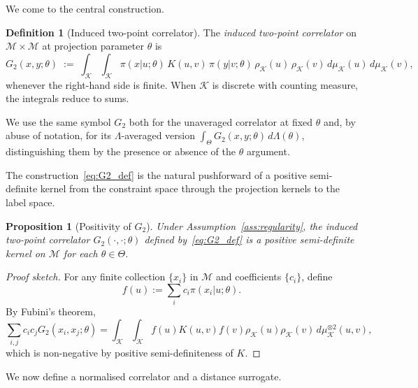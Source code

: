 ﻿\documentclass[12pt,a4paper]{article}
\newtheorem{proposition}[theorem]{Proposition}
\theoremstyle{definition}
\newtheorem{definition}[theorem]{Definition}
\begin{document}
We come to the central construction.

\begin{definition}[Induced two-point correlator]
The \emph{induced two-point correlator} on $\mathcal{M} \times \mathcal{M}$ at projection parameter $\theta$ is
\begin{equation}
\label{eq:G2_def}
G_2(x,y;\theta) \;:=\; \int_{\mathcal{K}} \int_{\mathcal{K}} \pi(x|u;\theta)\, K(u,v)\, \pi(y|v;\theta)\, \rho_{\mathcal{K}}(u)\,\rho_{\mathcal{K}}(v)\, d\mu_{\mathcal{K}}(u)\, d\mu_{\mathcal{K}}(v),
\end{equation}
whenever the right-hand side is finite. When $\mathcal{K}$ is discrete with counting measure, the integrals reduce to sums.
\end{definition}

We use the same symbol $G_2$ both for the unaveraged correlator at fixed $\theta$ and, by abuse of notation, for its $\Lambda$-averaged version $\int_\Theta G_2(x,y;\theta) \, d\Lambda(\theta)$, distinguishing them by the presence or absence of the $\theta$ argument.

The construction~\eqref{eq:G2_def} is the natural pushforward of a positive semi-definite kernel from the constraint space through the projection kernels to the label space.

\begin{proposition}[Positivity of $G_2$]
\label{prop:G2_psd}
Under Assumption~\ref{ass:regularity}, the induced two-point correlator $G_2(\cdot,\cdot;\theta)$ defined by~\eqref{eq:G2_def} is a positive semi-definite kernel on $\mathcal{M}$ for each $\theta \in \Theta$.
\end{proposition}

\begin{proof}[Proof sketch]
For any finite collection $\{x_i\}$ in $\mathcal{M}$ and coefficients $\{c_i\}$, define
\[
f(u) := \sum_i c_i \pi(x_i|u;\theta).
\]
By Fubini's theorem,
\[
\sum_{i,j} c_i c_j G_2(x_i,x_j;\theta)
=
\int_\mathcal{K} \int_\mathcal{K}
f(u) K(u,v) f(v) \rho_\mathcal{K}(u) \rho_\mathcal{K}(v)
\, d\mu_\mathcal{K}^{\otimes 2}(u,v),
\]
which is non-negative by positive semi-definiteness of $K$.
\end{proof}

We now define a normalised correlator and a distance surrogate.
\end{document}
